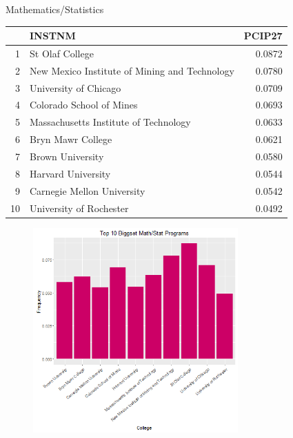 \documentclass{article}
\begin{document}
Mathematics/Statistics
\begin{table}[ht]
\centering
\begin{tabular}{rlr}
  \hline
 & INSTNM & PCIP27 \\ 
  \hline
1 & St Olaf College & 0.0872 \\ 
  2 & New Mexico Institute of Mining and Technology & 0.0780 \\ 
  3 & University of Chicago & 0.0709 \\ 
  4 & Colorado School of Mines & 0.0693 \\ 
  5 & Massachusetts Institute of Technology & 0.0633 \\ 
  6 & Bryn Mawr College & 0.0621 \\ 
  7 & Brown University & 0.0580 \\ 
  8 & Harvard University & 0.0544 \\ 
  9 & Carnegie Mellon University & 0.0542 \\ 
  10 & University of Rochester & 0.0492 \\ 
   \hline
\end{tabular}
\end{table}
\begin{figure}[H]
\includegraphics[width=0.7\textwidth]{../images/biggestMathStat.png}
\end{figure}

\clearpage
\end{document}
